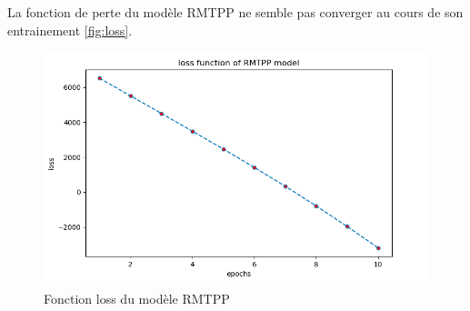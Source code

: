 \documentclass[../main.tex]{subfiles}
\begin{document}
La fonction de perte du modèle RMTPP ne semble pas converger au cours de son entrainement \autoref{fig:loss}.
\begin{figure}
	\centering
	\includegraphics[width=\linewidth]{../results/loss_funct}
	\caption{Fonction loss du modèle RMTPP}\label{fig:loss}
\end{figure}
\end{document}
